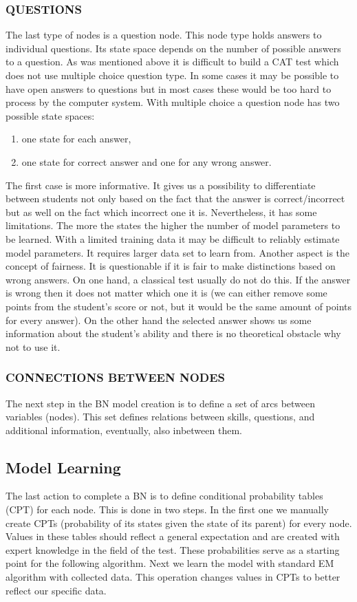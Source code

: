 \subsubsection{QUESTIONS}

The last type of nodes is a question node. This node type holds answers to individual questions. Its state space depends on the number of possible answers to a question. As was mentioned above it is difficult to build a CAT test which does not use multiple choice question type. In some cases it may be possible to have open answers to questions but in most cases these would be too hard to process by the computer system. With multiple choice a question node has two possible state spaces:
\begin{enumerate}
	\item one state for each answer,
	\item one state for correct answer and one for any wrong answer.
\end{enumerate}
The first case is more informative. It gives us a possibility to differentiate between students not only based on the fact that the answer is correct/incorrect but as well on the fact which incorrect one it is. Nevertheless, it has some limitations. The more the states the higher the number of model parameters to be learned. With a limited training data it may be difficult to reliably estimate model parameters. It requires larger data set to learn from. Another aspect is the concept of fairness. It is questionable if it is fair to make distinctions based on wrong answers. On one hand, a classical test usually do not do this. If the answer is wrong then it does not matter which one it is (we can either remove some points from the student's score or not, but it would be the same amount of points for every answer). On the other hand the selected answer shows us some information about the student's ability and there is no theoretical obstacle why not to use it.

\subsubsection{CONNECTIONS BETWEEN NODES}

The next step in the BN model creation is to define a set of arcs between variables (nodes). This set defines relations between skills, questions, and additional information, eventually, also inbetween them.  

\subsection{Model Learning}
The last action to complete a BN is to define conditional probability tables (CPT) for each node. This is done in two steps. In the first one we manually create CPTs (probability of its states given the state of its parent) for every node. Values in these tables should reflect a general expectation and are created with expert knowledge in the field of the test. These probabilities serve as a starting point for the following algorithm. Next we learn the model with standard EM algorithm with collected data. This operation changes values in CPTs to better reflect our specific data.

